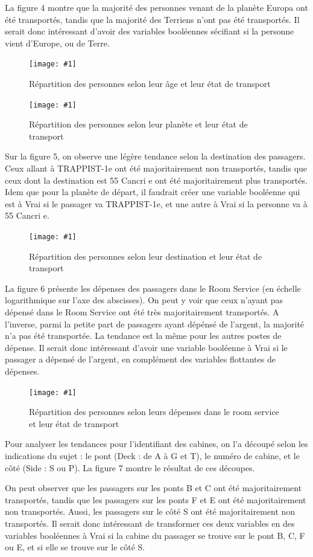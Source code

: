 \documentclass[a4paper]{article}
\newcommand{\illustration}[3]{
    \begin{figure}[h!]
        \centering
        \texttt{[image: \#1]}
        \caption{#2}
    \end{figure}
}
\begin{document}
    
    La figure 4 montre que la majorité des personnes venant de la planète Europa ont été transportés,
    tandis que la majorité des Terriens n'ont pas été transportés. Il serait donc intéressant d'avoir des
    variables booléennes sécifiant si la personne vient d'Europe, ou de Terre.
    
    \illustration{images/Figure 3.png}{Répartition des personnes selon leur âge et leur état de transport}{6cm}
    
    \illustration{images/Figure 4.png}{Répartition des personnes selon leur planète et leur état de transport}{6cm}
    
    Sur la figure 5, on observe une légère tendance selon la destination des passagers.
    Ceux allant à TRAPPIST-1e ont été majoritairement non transportés, tandis que ceux dont la destination est 55 Cancri e
    ont été majoritairement plus transportés. Idem que pour la planète de départ, il faudrait créer une variable booléenne
    qui est à Vrai si le passager va TRAPPIST-1e, et une autre à Vrai si la personne va à 55 Cancri e.

    \illustration{images/Figure 5.png}{Répartition des personnes selon leur destination et leur état de transport}{6cm}
    
    La figure 6 présente les dépenses des passagers dans le Room Service (en échelle logarithmique sur l'axe des abscisses).
    On peut y voir que ceux n'ayant pas dépensé dans le Room Service ont été très majoritairement transportés.
    A l'inverse, parmi la petite part de passagers ayant dépénsé de l'argent, la majorité n'a pas été transportée.
    La tendance est la même pour les autres postes de dépense.
    Il serait donc intéressant d'avoir une variable booléenne à Vrai si le passager a dépensé de l'argent,
    en complément des variables flottantes de dépenses.

    \illustration{images/Figure 6.png}{Répartition des personnes selon leurs dépenses dans le room service et leur état de transport}{6cm}

    Pour analyser les tendances pour l'identifiant des cabines, on l'a découpé selon les indications du sujet :
    le pont (Deck : de A à G et T), le numéro de cabine, et le côté (Side : S ou P). La figure 7 montre le résultat de ces découpes.

    On peut observer que les passagers sur les ponts B et C ont été majoritairement transportés,
    tandis que les passagers sur les ponts F et E ont été majoritairement non transportés.
    Aussi, les passagers sur le côté S ont été majoritairement non transportés.
    Il serait donc intéressant de transformer ces deux variables en des variables booléennes
    à Vrai si la cabine du passager se trouve sur le pont B, C, F ou E, et si elle se trouve sur le côté S.
\end{document}
